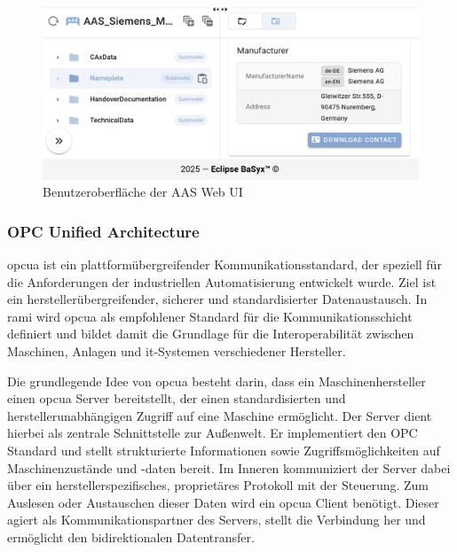 \vspace{0.5em}
\begin{figure}[htbp]
    \centering
    \includegraphics[width=1\textwidth]{Bilder/AASWebUZIGrundlagen.png}
    \caption[Benutzeroberfläche der AAS Web UI]{Benutzeroberfläche der AAS Web UI}
    \label{fig:BasyxWebUI}
\end{figure}


\subsubsection{OPC Unified Architecture}
\acs{opcua} ist ein plattformübergreifender Kommunikationsstandard, der speziell für die Anforderungen der industriellen Automatisierung entwickelt wurde.
Ziel ist ein herstellerübergreifender, sicherer und standardisierter Datenaustausch.
In \acs{rami} \cite{RAMI4.0} wird \acs{opcua} als empfohlener Standard für die Kommunikationsschicht definiert und bildet damit die Grundlage für die Interoperabilität zwischen Maschinen, Anlagen und \acs{it}-Systemen verschiedener Hersteller.

Die grundlegende Idee von \acs{opcua} besteht darin, dass ein Maschinenhersteller einen \acs{opcua} Server bereitstellt, der einen standardisierten und herstellerunabhängigen Zugriff auf eine Maschine ermöglicht.
Der Server dient hierbei als zentrale Schnittstelle zur Außenwelt. Er implementiert den OPC Standard und stellt strukturierte Informationen sowie Zugriffsmöglichkeiten auf Maschinenzustände und -daten bereit.
Im Inneren kommuniziert der Server dabei über ein herstellerspezifisches, proprietäres Protokoll mit der Steuerung.
Zum Auslesen oder Austauschen dieser Daten wird ein \acs{opcua} Client benötigt. Dieser agiert als Kommunikationspartner des Servers, stellt die Verbindung her und ermöglicht den bidirektionalen Datentransfer. \cite{OPCUA}